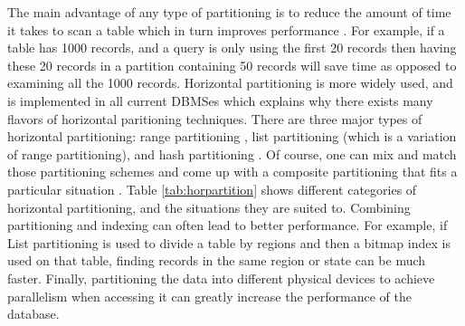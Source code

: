 \documentclass[12pt,a4paper]{article}
\begin{document}
The main advantage of any type of partitioning is to reduce the amount of time it takes to scan a table which in turn improves performance
\cite{lightstone2007physical}. For example, if a table has 1000 records, and a query is only using the first 20 records then having these 20 records in a
partition containing 50 records will save time as opposed to examining all the 1000 records. Horizontal partitioning is more widely used, and is implemented in
all current DBMSes \cite{mysqlpartitioning, sqlsrvpartitioning, sybasepartitioning, postgrepartitioning, oraclepartitioning, db2partitioning} which explains
why there exists many flavors of horizontal paritioning techniques. There are three major types of horizontal partitioning: range partitioning
\cite{dewitt1986gamma}, list partitioning \cite{lightstone2007physical} (which is a variation of range partitioning), and hash partitioning
\cite{lightstone2007physical}. Of course, one can mix and match those partitioning schemes and come up with a composite partitioning that fits a particular
situation \cite{lightstone2007physical}. Table \ref{tab:horpartition} shows different categories of horizontal partitioning, and the situations they are suited
to. Combining partitioning and indexing can often lead to better performance. For example, if List partitioning is used to divide a table by regions and then a
bitmap index is used on that table, finding records in the same region or state can be much faster. Finally, partitioning the data into different physical
devices to achieve parallelism when accessing it can greatly increase the performance of the database.
\end{document}
